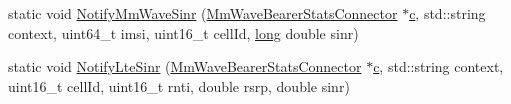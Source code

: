 \begin{DoxyCompactItemize}
\item 
static void \hyperlink{classns3_1_1MmWaveBearerStatsConnector_a4a4cd1cd9ff36c5e842f37f714311a82}{Notify\+Mm\+Wave\+Sinr} (\hyperlink{classns3_1_1MmWaveBearerStatsConnector}{Mm\+Wave\+Bearer\+Stats\+Connector} $\ast$\hyperlink{mmwave_2model_2fading-traces_2fading__trace__generator_8m_ae0323a9039add2978bf5b49550572c7c}{c}, std\+::string context, uint64\+\_\+t imsi, uint16\+\_\+t cell\+Id, \hyperlink{generate__test__data__lte__sinr_8m_a0eab6be67e93c3411f7a8b53cc297285}{long} double sinr)
\item 
static void \hyperlink{classns3_1_1MmWaveBearerStatsConnector_a723f7b49276a0af43402ff9b55399412}{Notify\+Lte\+Sinr} (\hyperlink{classns3_1_1MmWaveBearerStatsConnector}{Mm\+Wave\+Bearer\+Stats\+Connector} $\ast$\hyperlink{mmwave_2model_2fading-traces_2fading__trace__generator_8m_ae0323a9039add2978bf5b49550572c7c}{c}, std\+::string context, uint16\+\_\+t cell\+Id, uint16\+\_\+t rnti, double rsrp, double sinr)
\end{DoxyCompactItemize}

